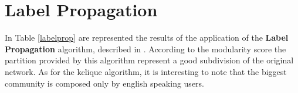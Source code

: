     \begin{table}[H]
        \centering
        \begin{subtable}{\textwidth}
        \end{subtable}
        \caption{Evaluation of the partitions obtained by the application of the K-Clique algorithm.}
        \label{kclique}
    \end{table}


\section{Label Propagation} %
\label{sec:label_propagation}
    In Table \ref{labelprop} are represented the results of the application of the \textbf{Label Propagation}
    algorithm, described in \cite{label_propagation}. According to the modularity score the partition provided by
    this algorithm represent a good subdivision of the original network. As for the kclique algorithm, it is
    interesting to note that the biggest community is composed only by english speaking users.


